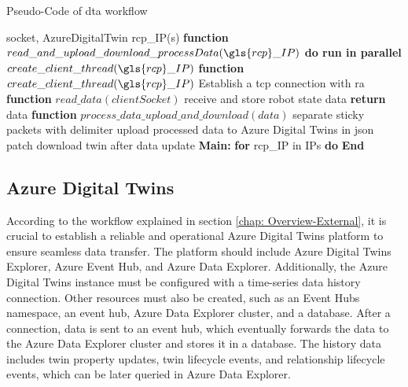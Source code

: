 \begin{breakablealgorithm}
    \caption{Pseudo-Code of \gls{dta} workflow}
    \label{alg:DTAgentPseudoCode}
    \begin{algorithmic}
     socket, AzureDigitalTwin
     \gls{rcp}\_IP(s)
    \State \textbf{function} {$read\_and\_upload\_download\_processData(\gls{rcp}\_IP)$}
        \State \qquad \textbf{do run in parallel}
            \State \qquad \qquad $create\_client\_thread(\gls{rcp}\_IP)$       
    \State \textbf{function} {$create\_client\_thread(\gls{rcp}\_IP)$}
        \State \qquad Establish a \gls{tcp} connection with \gls{ra}
        \State {}  
        \State {}    
    \State \textbf{function} {$read\_data(clientSocket)$}
        \State \qquad receive and store robot state data
        \State \qquad \textbf{return} data
    \State \textbf{function} {$process\_data\_upload\_and\_download(data)$}
        \State \qquad separate sticky packets with delimiter
        \State \qquad upload processed data to Azure Digital Twins in json patch
        \State \qquad download twin after data update 
    \State \textbf{Main:}
        \State \qquad \textbf{for} \gls{rcp}\_IP in IPs \textbf{do}
        \State \qquad {}
        \State \textbf{End}
    \end{algorithmic}
\end{breakablealgorithm}



\subsection{Azure Digital Twins}
According to the workflow explained in section \ref{chap: Overview-External}, 
it is crucial to establish a reliable and operational Azure Digital Twins platform 
to ensure seamless data transfer. The platform should include Azure Digital Twins Explorer, 
Azure Event Hub, and Azure Data Explorer. Additionally, the Azure Digital Twins 
instance must be configured with a time-series data history connection. Other resources 
must also be created, such as an Event Hubs namespace, an event hub, Azure Data Explorer 
cluster, and a database. 
After a connection, data is sent to an event hub, which eventually forwards the data to 
the Azure Data Explorer cluster and stores it in a database. The history data includes 
twin property updates, twin lifecycle events, and relationship lifecycle events, which 
can be later queried in Azure Data Explorer.

